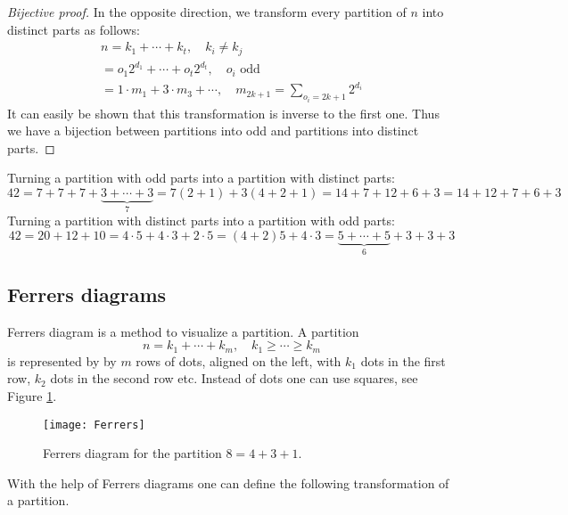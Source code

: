 \begin{page}
\begin{proof}[Bijective proof]
In the opposite direction, we transform every partition of $n$ into distinct parts as follows:
\begin{multline*}
n = k_1 + \cdots + k_t, \quad k_i \ne k_j\\
= o_1 2^{d_1} + \cdots + o_t 2^{d_t}, \quad o_i \text{ odd}\\
= 1 \cdot m_1 + 3 \cdot m_3 + \cdots, \quad m_{2k+1} = \sum_{o_i = 2k+1} 2^{d_i}
\end{multline*}
It can easily be shown that this transformation is inverse to the first one.
Thus we have a bijection between partitions into odd and partitions into distinct parts.
\end{proof}


\end{page}

\begin{page}
\setcounter{section}{3}
\setcounter{subsection}{5}
\setcounter{dfn}{12}
\label{portion:922}

\begin{exl}
Turning a partition with odd parts into a partition with distinct parts:
\[
42 = 7+7+7+\underbrace{3+ \cdots +3}_{7} = 7 (2+1) + 3(4+2+1) = 14 + 7 + 12 + 6 + 3 = 14 + 12 + 7 + 6 + 3
\]
Turning a partition with distinct parts into a partition with odd parts:
\[
42 = 20 + 12 + 10 = 4\cdot 5 + 4 \cdot 3 + 2 \cdot 5 = (4+2)5 + 4\cdot 3 = \underbrace{5+\cdots+5}_{6} + 3 + 3 + 3
\]
\end{exl}

\end{page}

\begin{page}
\setcounter{section}{3}
\setcounter{subsection}{6}
\setcounter{dfn}{12}
\label{portion:925}

\subsection{Ferrers diagrams}
Ferrers diagram is a method to visualize a partition.
A partition
\[
n = k_1 + \cdots + k_m, \quad k_1 \ge \cdots \ge k_m
\]
is represented by by $m$ rows of dots, aligned on the left, with $k_1$ dots in the first row, $k_2$ dots in the second row etc.
Instead of dots one can use squares, see Figure \ref{fig:Ferrers}.

\begin{figure}[ht]
\begin{center}
\texttt{[image: Ferrers]}
\end{center}
\caption{Ferrers diagram for the partition $8 = 4 + 3 + 1$.}
\label{fig:Ferrers}
\end{figure}

With the help of Ferrers diagrams one can define the following transformation of a partition.


\end{page}


